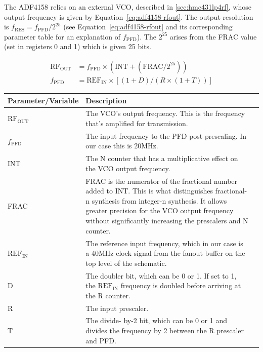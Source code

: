 The ADF4158 relies on an external VCO, described in \cref{sec:hmc431lp4rf}, whose output frequency
is given by Equation~\ref{eq:adf4158-rfout}. The output resolution is
$f_{\text{RES}} = f_{\text{PFD}}/2^{25}$ (see Equation~\ref{eq:adf4158-rfout} and its corresponding
parameter table for an explanation of $f_{\text{PFD}}$). The $2^{25}$ arises from the FRAC value
(set in registers 0 and 1) which is given 25 bits.

\begin{align}
  \text{RF}_{\text{OUT}} &= f_{\text{PFD}} \times \left(\text{INT} +
                           \left(\text{FRAC}/2^{25}\right)\right) \label{eq:adf4158-rfout} \\
  f_{\text{PFD}} &= \text{REF}_{\text{IN}} \times \left[\left(1 + D\right)/\left(R\times \left(1 +
                   T\right)\right) \right] \nonumber
\end{align}

\label{tab:adf4158-rfout-equation-vars}
\begin{tabularx}{\textwidth}{l X>{\raggedright\arraybackslash}X}
        \toprule
        \textbf{Parameter/Variable} & \textbf{Description} \\
        \midrule
        \endhead{}

        $\text{RF}_{\text{OUT}}$ & The VCO's output frequency. This is the frequency that's amplified for
        transmission. \\
        $f_{\text{PFD}}$ & The input frequency to the PFD post prescaling. In our case this is 20MHz. \\
        INT & The N counter that has a multiplicative effect on the VCO output frequency. \\
        FRAC & FRAC is the numerator of the fractional number added to INT. This is what distinguishes
        fractional-n synthesis from integer-n synthesis. It allows greater precision for the VCO
        output frequency without significantly increasing the prescalers and N counter. \\
        $\text{REF}_{\text{IN}} $ & The reference input frequency, which in our case is a 40MHz clock
        signal from the fanout buffer on the top level of the schematic. \\
        D & The doubler bit, which can be 0 or 1. If set to 1, the $\text{REF}_{\text{IN}}$ frequency is
        doubled before arriving at the R counter. \\
        R & The input prescaler. \\
        T & The divide- by-2 bit, which can be 0 or 1 and divides the frequency by 2 between the R
        prescaler and PFD. \\

        \bottomrule
\end{tabularx}

